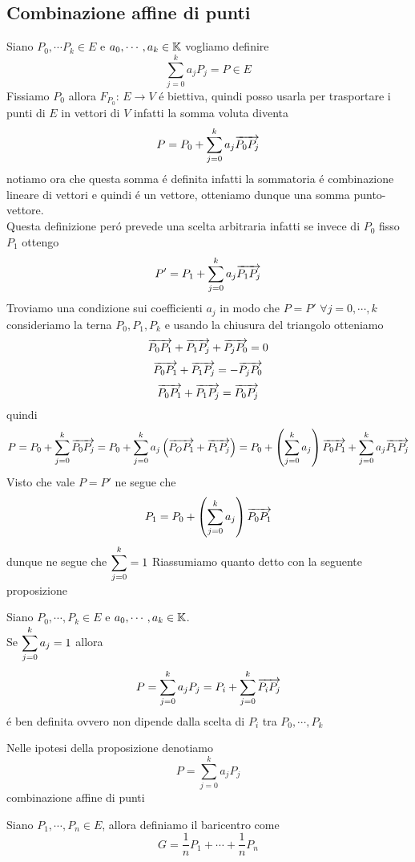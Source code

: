\subsection{Combinazione affine di punti}
Siano $P_0, \cdots P_k \in E$ e $a_0, \cdots , a_k \in \mathbb{K}$
vogliamo definire 
$$ \sum_{j=0}^k a_j P_j =P\in E $$
Fissiamo $P_0$ allora $F_{P_0}:\, E \to V $ \'e biettiva, quindi posso usarla per trasportare i punti di $E$ in vettori di $V$ infatti la somma voluta diventa
$$ P=P_0 + \sum_{j=0}^k a_j \overrightarrow{P_0P_j} $$
notiamo ora che questa somma \'e definita infatti la sommatoria \'e combinazione lineare di vettori e quindi \'e un vettore, otteniamo dunque una somma punto-vettore.\\
Questa definizione per\'o prevede una scelta arbitraria infatti se invece di $P_0$ fisso $P_1$ ottengo
$$ P'=P_1 + \sum_{j=0}^k a_j \overrightarrow{ P_1 P_j} $$
Troviamo una condizione sui coefficienti $a_j$ in modo che $P=P'$
$\forall j=0, \cdots, k $ consideriamo la terna $P_0,P_1, P_k$ e usando la chiusura del triangolo otteniamo 
$$ \overrightarrow{ P_0P_1} + \overrightarrow{P_1P_j} + \overrightarrow{P_jP_0} = 0 $$
$$ \overrightarrow{ P_0P_1} + \overrightarrow{P_1P_j} =- \overrightarrow{P_jP_0} $$
$$ \overrightarrow{ P_0P_1} + \overrightarrow{P_1P_j} = \overrightarrow{P_0P_j} $$
quindi 
$$ P=P_0 + \sum_{j=0}^k \overrightarrow{P_0P_j}=P_0 + \sum_{j=0}^k a_j \left( \overrightarrow{P_OP_1}+ \overrightarrow{P_1P_j} \right)=
P_0+ \left( \sum_{j=0}^k a_j \right) \overrightarrow{P_0P_1} + \sum_{j=0}^k a_j \overrightarrow{P_1P_j }$$
Visto che vale $P=P'$ ne segue che 
$$ P_1= P_0 + \left(\sum_{j=0}^k a_j \right) \overrightarrow { P_0P_1} $$
dunque ne segue che $\displaystyle \sum_{j=0}^k=1$
Riassumiamo quanto detto con la seguente proposizione
\begin{prop} Siano $P_0, \cdots , P_k \in E $ e $a_0, \cdots , a_k  \in \mathbb{K}$.\\
Se $\displaystyle \sum_{j=0}^k a_j=1 $ allora
$$ P=\sum_{j=0}^k a_j P_j = P_i + \sum_{j=0}^k \overrightarrow{P_iP_j} $$
\'e ben definita ovvero non dipende dalla scelta di $P_i $ tra $P_0 ,\cdots , P_k $
\end{prop}
\begin{defn}Nelle ipotesi della proposizione denotiamo  
$$ P= \sum_{j=0}^k a_jP_j $$ 
combinazione affine di punti
\end{defn}

\spazio

\begin{defn}[Baricentro]\bianco Siano $P_1, \cdots, P_n \in E $, allora definiamo il baricentro come 
$$ G = \frac{1}{n}P_1 + \cdots + \frac{1}{n}P_n $$
\end{defn}
\newpage
